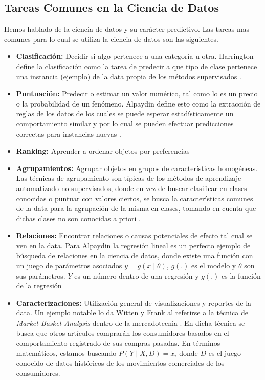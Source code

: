 \subsection{Tareas Comunes en la Ciencia de Datos}
Hemos hablado de la ciencia de datos y su carácter predictivo. Las tareas mas comunes para lo cual se utiliza la ciencia de datos son las siguientes.

\begin{itemize}
	\item \textbf{Clasificación:} Decidir si algo pertenece a una categoría u otra. Harrington define la clasificación como la tarea de predecir a que tipo de clase pertenece una instancia (ejemplo) de la data propia de los métodos supervisados \cite{harrington}.
	\item \textbf{Puntuación:} Predecir o estimar un valor numérico, tal como lo es un precio o la probabilidad de un fenómeno. Alpaydin define esto como la extracción de reglas de los datos de los cuales se puede esperar estadísticamente un comportamiento similar y por lo cual se pueden efectuar predicciones correctas para instancias nuevas \cite{alpaydin}.
	\item \textbf{Ranking:} Aprender a ordenar objetos por preferencias
	\item \textbf{Agrupamientos:} Agrupar objetos en grupos de características homogéneas. Las técnicas de agrupamiento son típicas de los métodos de aprendizaje automatizado no-supervisados, donde en vez de buscar clasificar en clases conocidas o puntuar con valores ciertos, se busca la características comunes de la data para la agrupación de la misma en clases, tomando en cuenta que dichas clases no son conocidas a priori \cite{harrington}.
	\item \textbf{Relaciones:} Encontrar relaciones o causas potenciales de efecto tal cual se ven en la data. Para Alpaydin la regresión lineal es un perfecto ejemplo de búsqueda de relaciones en la ciencia de datos, donde existe una función con un juego de parámetros asociados $y = g(x \mid \theta)$, $g(.)$ es el modelo y $\theta$ son sus parámetros. $Y$ es un número dentro de una regresión y $g(.)$ es la función de la regresión \cite{alpaydin}
	\item \textbf{Caracterizaciones:} Utilización general de visualizaciones y reportes de la data. Un ejemplo notable lo da Witten y Frank al referirse a la técnica de \emph{Market Basket Analysis} dentro de la mercadotecnia \cite{datamining}. En dicha técnica se busca que otros artículos comprarán los consumidores basados en el comportamiento registrado de sus compras pasadas. En términos matemáticos, estamos buscando $P(Y \mid X,D) = x_i$ donde $D$ es el juego conocido de datos históricos de los movimientos comerciales de los consumidores.
\end{itemize}

